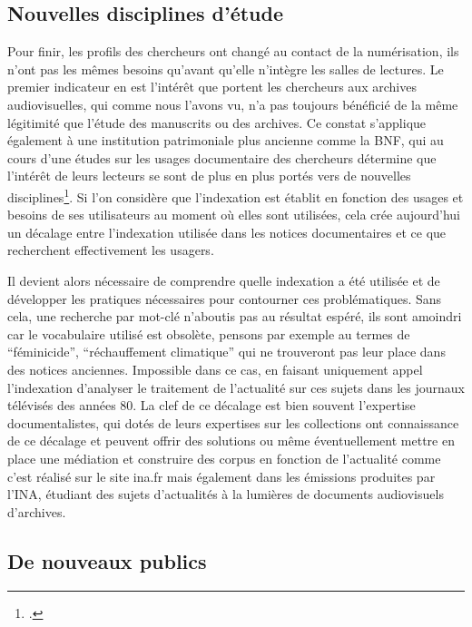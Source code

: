\subsection{Nouvelles disciplines d'étude}


Pour finir, les profils des chercheurs ont changé au contact de la numérisation, ils n'ont pas les mêmes besoins qu'avant qu'elle n'intègre les salles de lectures. Le premier indicateur en est l'intérêt que portent les chercheurs aux archives audiovisuelles, qui comme nous l'avons vu, n'a pas toujours bénéficié de la même légitimité que l'étude des manuscrits ou des archives. Ce constat s'applique également à une institution patrimoniale plus ancienne comme la BNF, qui au cours d'une études sur les usages documentaire des chercheurs détermine que l'intérêt de leurs lecteurs se sont de plus en plus portés vers de nouvelles disciplines\footcite{pardé2015}. Si l'on considère que l'indexation est établit en fonction des usages et besoins de ses utilisateurs au moment où elles sont utilisées, cela crée aujourd'hui un décalage entre l'indexation utilisée dans les notices documentaires et ce que recherchent effectivement les usagers. 


Il devient alors nécessaire de comprendre quelle indexation a été utilisée et de développer les pratiques nécessaires pour contourner ces problématiques. Sans cela, une recherche par mot-clé n’aboutis pas au résultat espéré, ils sont amoindri car le vocabulaire utilisé est obsolète, pensons par exemple au termes de \enquote{féminicide}, \enquote{réchauffement climatique} qui ne trouveront pas leur place dans des notices anciennes. Impossible dans ce cas, en faisant uniquement appel l'indexation d'analyser le traitement de l'actualité sur ces sujets dans les journaux télévisés des années 80. La clef de ce décalage est bien souvent l'expertise documentalistes, qui dotés de leurs expertises sur les collections ont connaissance de ce décalage et peuvent offrir des solutions ou même éventuellement mettre en place une médiation et construire des corpus en fonction de l'actualité comme c'est réalisé sur le site ina.fr mais également dans les émissions produites par l'INA, étudiant des sujets d'actualités à la lumières de documents audiovisuels d'archives. 

\subsection{De nouveaux publics}

